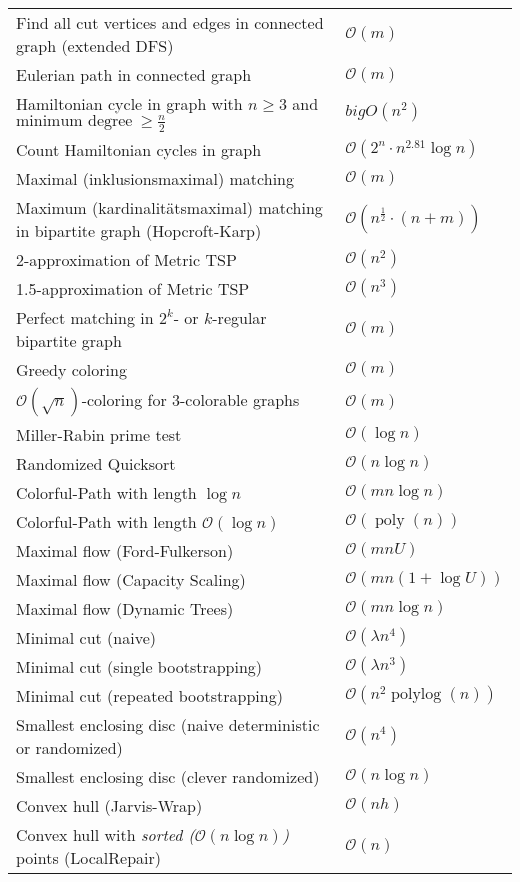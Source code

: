 \documentclass[a4paper,10pt]{article}
\newcommand{\bigO}{\mathcal{O}}
\DeclareMathOperator{\poly}{poly}
\DeclareMathOperator{\polylog}{polylog}
\begin{document}
    \begin{center}
    \begin{tabularx}{\textwidth}{Xl}
        \toprule
        Find all cut vertices and edges in connected graph (extended DFS) & \(\bigO(m)\) \\
        Eulerian path in connected graph & \(\bigO(m)\) \\
        Hamiltonian cycle in graph with $n \geq 3$ and $\text{minimum degree} \ \geq \frac{n}{2}$ & \(bigO(n^2)\) \\
        Count Hamiltonian cycles in graph & \(\bigO(2^n \cdot n^{2.81} \log n)\) \\
        Maximal (inklusionsmaximal) matching & \(\bigO(m)\) \\
        Maximum (kardinalitätsmaximal) matching in bipartite graph (Hopcroft-Karp) & \(\bigO(n^\frac{1}{2} \cdot (n+m))\) \\
        2-approximation of Metric TSP & \(\bigO(n^2)\) \\
        1.5-approximation of Metric TSP & \(\bigO(n^3)\) \\
        Perfect matching in \(2^k\)- or $k$-regular bipartite graph & \(\bigO(m)\) \\
        Greedy coloring & \(\bigO(m)\) \\
        \(\bigO(\sqrt{n})\)-coloring for 3-colorable graphs & \(\bigO(m)\) \\
        Miller-Rabin prime test & \(\bigO(\log n)\) \\
        Randomized Quicksort & \(\bigO(n \log n)\)\footnotemark \\
        Colorful-Path with length \(\log n\) & \(\bigO(mn \log n)\) \\
        Colorful-Path with length \(\bigO(\log n)\) & \(\bigO(\poly(n))\) \\
        Maximal flow (Ford-Fulkerson) & \(\bigO(mnU)\)\\
        Maximal flow (Capacity Scaling) & \(\bigO(mn(1 + \log U))\) \\
        Maximal flow (Dynamic Trees) & \(\bigO(mn\log n)\) \\
        Minimal cut (naive) & \(\bigO(\lambda n^4)\) \\
        Minimal cut (single bootstrapping) & \(\bigO(\lambda n^3)\) \\
        Minimal cut (repeated bootstrapping) & \(\bigO(n^2\polylog(n))\) \\
        Smallest enclosing disc (naive deterministic or randomized) & \(\bigO(n^4)\)\footnotemark[\value{footnote}] \\
        Smallest enclosing disc (clever randomized) & \(\bigO(n \log n)\)\footnotemark[\value{footnote}] \\
        Convex hull (Jarvis-Wrap) & \(\bigO(nh)\) \\
        Convex hull with \emph{sorted ($\bigO(n \log n)$)} points (LocalRepair) & \(\bigO(n)\) \\
        \bottomrule
    \end{tabularx}
    \end{center}
\end{document}
